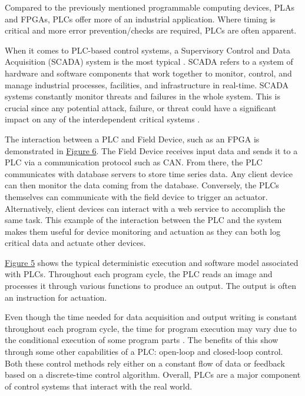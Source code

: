 \documentclass[12pt]{article}
\begin{document}
        Compared to the previously mentioned programmable computing devices, 
        PLAs and FPGAs, PLCs offer more of an industrial application. Where timing 
        is critical and more error prevention/checks are required, PLCs are 
        often apparent. 
        
        When it comes to PLC-based control systems, a Supervisory 
        Control and Data Acquisition (SCADA) system is the most typical 
        \autocite[3]{pr11030918}. SCADA refers to a system of hardware and 
        software components that work together to monitor, control, and manage
        industrial processes, facilities, and infrastructure in real-time. SCADA 
        systems constantly monitor threats and failures in the whole system. This 
        is crucial since any potential attack, failure, or threat could have a 
        significant impact on any of the interdependent critical systems 
        \autocite[121]{Alcaraz2012}. 
        
        The interaction between a PLC and Field Device,
        such as an FPGA is demonstrated in \hyperref[scada_inf]{Figure 6}. The 
        Field Device receives input data and sends it to a PLC via a communication
        protocol such as CAN. From there, the PLC communicates with database 
        servers to store time series data. Any client device can then monitor the
        data coming from the database. Conversely, the PLCs themselves can 
        communicate with the field device to trigger an actuator. Alternatively,
        client devices can interact with a web service to accomplish the same task.
        This example of the interaction between the PLC and the system makes
        them useful for device monitoring and actuation as they can both log 
        critical data and actuate other devices.
        
        \hyperref[plc_seq]{Figure 5} shows the typical deterministic execution
        and software model associated with PLCs. Throughout each program cycle, 
        the PLC reads an image and processes it through various functions to 
        produce an output. The output is often an instruction for actuation.

        Even though the time needed for data acquisition and output writing is 
        constant throughout each program cycle, the time for program execution may
        vary due to the conditional execution of some program parts 
        \autocite[2]{Frey2014}. The benefits of this show through some other 
        capabilities of a PLC: open-loop and closed-loop control. Both these 
        control methods rely either on a constant flow of data or feedback based 
        on a discrete-time control algorithm. Overall, PLCs are a major component
        of control systems that interact with the real world.
\end{document}
